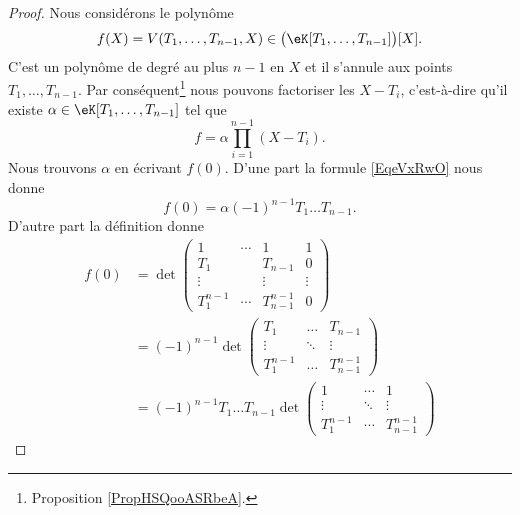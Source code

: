 \begin{proof}
	Nous considérons le polynôme
	\begin{equation}
		f(X)=V(T_1,\ldots, T_{n-1},X)\in \big( \eK[T_1,\ldots, T_{n-1}] \big)[X].
	\end{equation}
	C'est un polynôme de degré au plus \( n-1\) en \( X\) et il s'annule aux points \( T_1,\ldots, T_{n-1}\). Par conséquent\footnote{Proposition \ref{PropHSQooASRbeA}.} nous pouvons factoriser les \( X-T_i\), c'est-à-dire qu'il existe \( \alpha\in \eK[T_1,\ldots, T_{n-1}]\) tel que
	\begin{equation}    \label{EqeVxRwO}
		f=\alpha\prod_{i=1}^{n-1}(X-T_i).
	\end{equation}
	Nous trouvons \( \alpha\) en écrivant \( f(0)\). D'une part la formule \eqref{EqeVxRwO} nous donne
	\begin{equation}    \label{EqblwWMj}
		f(0)=\alpha(-1)^{n-1}T_1\ldots T_{n-1}.
	\end{equation}
	D'autre part la définition donne
	\begin{subequations}
		\begin{align}
			f(0) & =\det\begin{pmatrix}
				            1         & \cdots & 1             & 1      \\
				            T_1       &        & T_{n-1}       & 0      \\
				            \vdots    &        & \vdots        & \vdots \\
				            T_1^{n-1} & \cdots & T_{n-1}^{n-1} & 0
			            \end{pmatrix}                   \\
			     & =(-1)^{n-1}\det\begin{pmatrix}
				                      T_1       & \ldots & T_{n-1}       \\
				                      \vdots    & \ddots & \vdots        \\
				                      T_1^{n-1} & \ldots & T_{n-1}^{n-1}
			                      \end{pmatrix}                  \\
			     & =(-1)^{n-1}T_1\ldots T_{n-1}\det\begin{pmatrix}
				                                       1         & \cdots & 1             \\
				                                       \vdots    & \ddots & \vdots        \\
				                                       T_1^{n-1} & \cdots & T_{n-1}^{n-1}

\end{pmatrix}
\end{align}
\end{subequations}
\end{proof}
